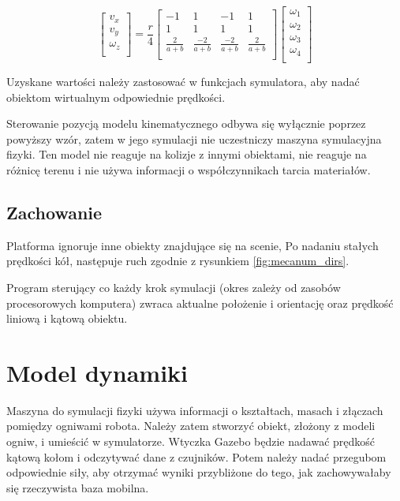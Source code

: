 	\begin{equation}
	\begin{bmatrix}
	v_x \\
	v_y \\
	\omega_z \\
	\end{bmatrix}
	=
	\frac{r}{4}
	\begin{bmatrix}
	-1 & 1 & -1 & 1 \\
	1 & 1 & 1 & 1 \\
	\frac{2}{a+b} & \frac{-2}{a+b} & \frac{-2}{a+b} & \frac{2}{a+b} \\
	\end{bmatrix}
	\begin{bmatrix}
	\omega_1 \\
	\omega_2 \\
	\omega_3 \\
	\omega_4 \\
	\end{bmatrix}
	\end{equation}
	
	Uzyskane wartości należy zastosować w funkcjach symulatora, aby nadać obiektom wirtualnym odpowiednie prędkości.
	
	Sterowanie pozycją modelu kinematycznego odbywa się wyłącznie poprzez powyższy wzór, zatem w jego symulacji nie uczestniczy maszyna symulacyjna fizyki.
	Ten model nie reaguje na kolizje z innymi obiektami, nie reaguje na różnicę terenu i nie używa informacji o współczynnikach tarcia materiałów.

	\subsection{Zachowanie}
		Platforma ignoruje inne obiekty znajdujące się na scenie,
		Po nadaniu stałych prędkości kół, następuje ruch zgodnie z rysunkiem \ref{fig:mecanum_dirs}.

		Program sterujący co każdy krok symulacji (okres zależy od zasobów procesorowych komputera) zwraca aktualne położenie i orientację oraz prędkość liniową i kątową obiektu.

\section{Model dynamiki}
	\label{sec:omnivelma}
	Maszyna do symulacji fizyki używa informacji o kształtach, masach i złączach pomiędzy ogniwami robota.
	Należy zatem stworzyć obiekt, złożony z modeli ogniw, i umieścić w symulatorze.
	Wtyczka Gazebo będzie nadawać prędkość kątową kołom i odczytywać dane z czujników.
	Potem należy nadać przegubom odpowiednie siły, aby otrzymać wyniki przybliżone do tego, jak zachowywałaby się rzeczywista baza mobilna.


